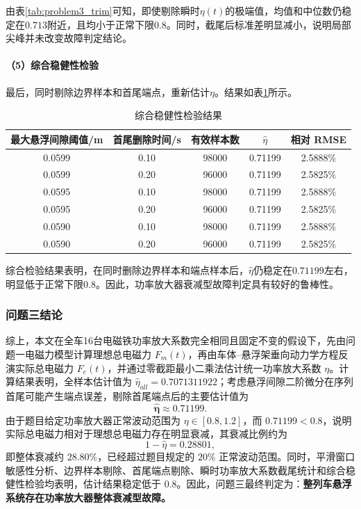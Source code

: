 \documentclass[a4paper]{nmmcm}
\begin{document}
由表\ref{tab:problem3_trim}可知，即使剔除瞬时$\eta(t)$的极端值，均值和中位数仍稳定在$0.713$附近，且均小于正常下限$0.8$。同时，截尾后标准差明显减小，说明局部尖峰并未改变故障判定结论。

\paragraph{（5）综合稳健性检验}

最后，同时剔除边界样本和首尾端点，重新估计$\eta$。结果如表\ref{tab:problem3_comprehensive}所示。

\FloatBarrier
\begin{table}[H]
\centering
\caption{综合稳健性检验结果}
\label{tab:problem3_comprehensive}
\begin{tabular}{c c c c c}
\hline
最大悬浮间隙阈值/m & 首尾删除时间/s & 有效样本数 & $\hat{\eta}$ & 相对 RMSE \\
\hline
0.0599 & 0.10 & 98000 & 0.71199 & 2.5888\% \\
0.0599 & 0.20 & 96000 & 0.71199 & 2.5825\% \\
0.0595 & 0.10 & 98000 & 0.71199 & 2.5888\% \\
0.0595 & 0.20 & 96000 & 0.71199 & 2.5825\% \\
0.0590 & 0.10 & 98000 & 0.71199 & 2.5888\% \\
0.0590 & 0.20 & 96000 & 0.71199 & 2.5825\% \\
\hline
\end{tabular}
\end{table}
\FloatBarrier

综合检验结果表明，在同时删除边界样本和端点样本后，$\hat{\eta}$仍稳定在$0.71199$左右，明显低于正常下限$0.8$。因此，功率放大器衰减型故障判定具有较好的鲁棒性。

\subsubsection{问题三结论}

综上，本文在全车16台电磁铁功率放大系数完全相同且固定不变的假设下，先由问题一电磁力模型计算理想总电磁力 $F_m(t)$，再由车体--悬浮架垂向动力学方程反演实际总电磁力 $F_e(t)$，并通过零截距最小二乘法估计统一功率放大系数 $\eta$。计算结果表明，全样本估计值为 $\hat{\eta}_{all}=0.7071311922$；考虑悬浮间隙二阶微分在序列首尾可能产生端点误差，剔除首尾端点后的主要估计值为
\[
\bm{\hat{\eta}\approx0.71199}.
\]
由于题目给定功率放大器正常波动范围为 $\eta\in[0.8,1.2]$，而 $0.71199<0.8$，说明实际总电磁力相对于理想总电磁力存在明显衰减，其衰减比例约为
\[
1-\hat{\eta}=0.28801,
\]
即整体衰减约 $28.80\%$，已经超过题目规定的 $20\%$ 正常波动范围。同时，平滑窗口敏感性分析、边界样本剔除、首尾端点剔除、瞬时功率放大系数截尾统计和综合稳健性检验均表明，估计结果稳定低于 $0.8$。因此，问题三最终判定为：\textbf{整列车悬浮系统存在功率放大器整体衰减型故障。}
\end{document}
